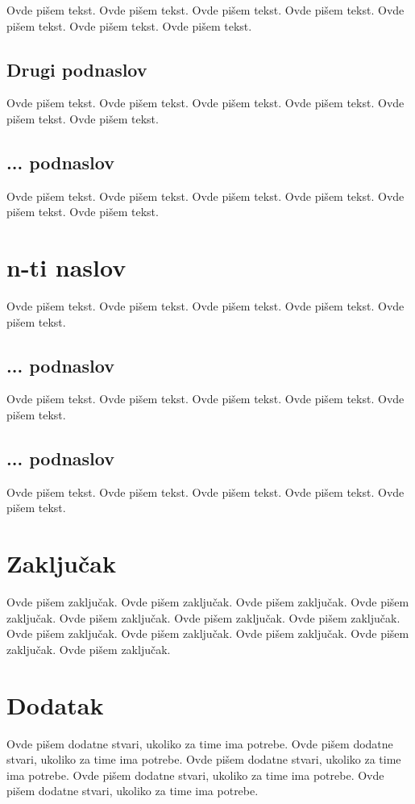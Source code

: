 \documentclass[a4paper]{article}
\begin{document}
Ovde pišem tekst.
Ovde pišem tekst.
Ovde pišem tekst.
Ovde pišem tekst.
Ovde pišem tekst.
Ovde pišem tekst.
Ovde pišem tekst.

\subsection{Drugi podnaslov}
\label{subsec:podnaslov2}

Ovde pišem tekst.
Ovde pišem tekst.
Ovde pišem tekst.
Ovde pišem tekst.
Ovde pišem tekst.
Ovde pišem tekst.


\subsection{... podnaslov}
\label{subsec:podnaslovN}

Ovde pišem tekst.
Ovde pišem tekst.
Ovde pišem tekst.
Ovde pišem tekst.
Ovde pišem tekst.
Ovde pišem tekst.

\section{n-ti naslov}
\label{sec:naslovN}

Ovde pišem tekst.
Ovde pišem tekst.
Ovde pišem tekst.
Ovde pišem tekst.
Ovde pišem tekst.

\subsection{... podnaslov}
\label{subsec:podnaslovK}

Ovde pišem tekst.
Ovde pišem tekst.
Ovde pišem tekst.
Ovde pišem tekst.
Ovde pišem tekst.

\subsection{... podnaslov}
\label{subsec:podnaslovM}

Ovde pišem tekst.
Ovde pišem tekst.
Ovde pišem tekst.
Ovde pišem tekst.
Ovde pišem tekst.


\section{Zaključak}
\label{sec:zakljucak}

Ovde pišem zaključak.
Ovde pišem zaključak.
Ovde pišem zaključak.
Ovde pišem zaključak.
Ovde pišem zaključak.
Ovde pišem zaključak.
Ovde pišem zaključak.
Ovde pišem zaključak.
Ovde pišem zaključak.
Ovde pišem zaključak.
Ovde pišem zaključak.
Ovde pišem zaključak.


\appendix



\appendix
\section{Dodatak}
Ovde pišem dodatne stvari, ukoliko za time ima potrebe.
Ovde pišem dodatne stvari, ukoliko za time ima potrebe.
Ovde pišem dodatne stvari, ukoliko za time ima potrebe.
Ovde pišem dodatne stvari, ukoliko za time ima potrebe.
Ovde pišem dodatne stvari, ukoliko za time ima potrebe.
\end{document}
